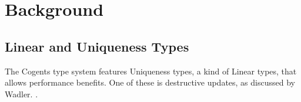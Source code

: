 \chapter{Background}\label{ch:background}

\section{Linear and Uniqueness Types}

The Cogents type system features Uniqueness types, a kind of Linear types, that allows performance benefits.
One of these is destructive updates, as discussed by Wadler. .